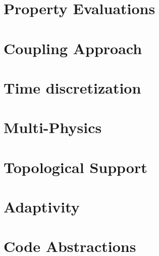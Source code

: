 \documentclass[12pt]{report}
\begin{document}
\section{Property Evaluations}


\section{Coupling Approach}


\section{Time discretization}


\section{Multi-Physics}


\section{Topological Support}


\section{Adaptivity}


\section{Code Abstractions}




\end{document}
